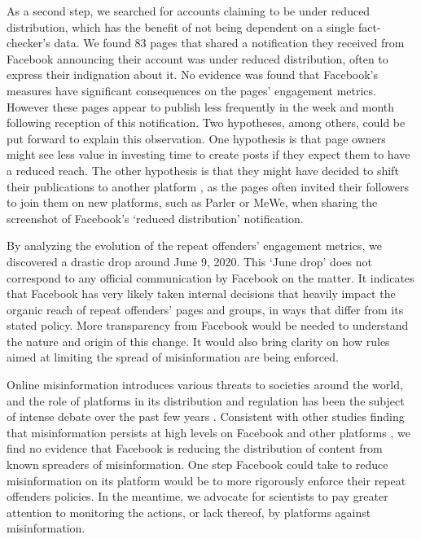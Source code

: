 \documentclass[11pt,a4paper]{article}
\begin{document}
As a second step, we searched for accounts claiming to be under reduced distribution, which has the benefit of not being dependent on a single fact-checker’s data. We found 83 pages that shared a notification they received from Facebook announcing their account was under reduced distribution, often to express their indignation about it. No evidence was found that Facebook’s measures have significant consequences on the pages’ engagement metrics. However these pages appear to publish less frequently in the week and month following reception of this notification. Two hypotheses, among others, could be put forward to explain this observation. One hypothesis is that page owners might see less value in investing time to create posts if they expect them to have a reduced reach. The other hypothesis is that they might have decided to shift their publications to another platform \citep{rogers2020deplatforming, rauchfleisch2021deplatforming}, as the pages often invited their followers to join them on new platforms, such as Parler or MeWe, when sharing the screenshot of Facebook's `reduced distribution' notification.

By analyzing the evolution of the repeat offenders’ engagement metrics, we discovered a drastic drop around June 9, 2020. This `June drop' does not correspond to any official communication by Facebook on the matter. It indicates that Facebook has very likely taken internal decisions that heavily impact the organic reach of repeat offenders' pages and groups, in ways that differ from its stated policy. More transparency from Facebook would be needed to understand the nature and origin of this change. It would also bring clarity on how rules aimed at limiting the spread of misinformation are being enforced.

Online misinformation introduces various threats to societies around the world, and the role of platforms in its distribution and regulation has been the subject of intense debate over the past few years \citep{rogers2020deplatforming, de2020internet}. Consistent with other studies finding that misinformation persists at high levels on Facebook and other platforms \citep{kornbluh2020new, resnick2018iffy}, we find no evidence that Facebook is reducing the distribution of content from known spreaders of misinformation. One step Facebook could take to reduce misinformation on its platform would be to more rigorously enforce their repeat offenders policies. In the meantime, we advocate for scientists to pay greater attention to monitoring the actions, or lack thereof, by platforms against misinformation. 

 


\end{document}
